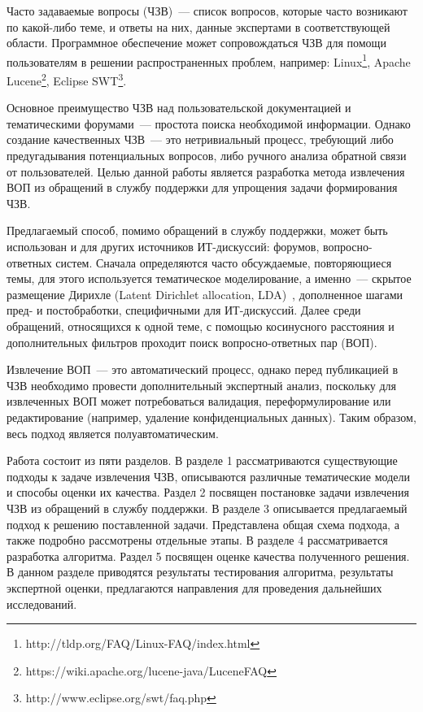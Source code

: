 \intro

Часто задаваемые вопросы (ЧЗВ)~--- список вопросов, которые часто возникают по какой-либо теме, и ответы на них, данные экспертами в соответствующей области. Программное обеспечение может сопровождаться ЧЗВ для помощи пользователям в решении распространенных проблем, например: Linux\footnote{http://tldp.org/FAQ/Linux-FAQ/index.html}, Apache Lucene\footnote{https://wiki.apache.org/lucene-java/LuceneFAQ}, Eclipse SWT\footnote{http://www.eclipse.org/swt/faq.php}.

Основное преимущество ЧЗВ над пользовательской документацией и тематическими форумами~--- простота поиска необходимой информации. Однако создание качественных ЧЗВ~--- это нетривиальный процесс, требующий либо предугадывания потенциальных вопросов, либо ручного анализа обратной связи от пользователей. Целью данной работы является разработка метода извлечения ВОП из обращений в службу поддержки для упрощения задачи формирования ЧЗВ.

Предлагаемый способ, помимо обращений в службу поддержки, может быть использован и для других источников ИТ-дискуссий: форумов, вопросно-ответных систем. Сначала определяются часто обсуждаемые, повторяющиеся темы, для этого используется тематическое моделирование, а именно~--- скрытое размещение Дирихле (Latent Dirichlet allocation, LDA)~\cite{LDA}, дополненное шагами пред- и постобработки, специфичными для ИТ-дискуссий. Далее среди обращений, относящихся к одной теме, с помощью косинусного расстояния и дополнительных фильтров проходит поиск вопросно-ответных пар (ВОП). 


Извлечение ВОП~--- это автоматический процесс, однако перед публикацией в ЧЗВ необходимо провести дополнительный экспертный анализ, поскольку для извлеченных ВОП может потребоваться валидация, переформулирование или редактирование (например, удаление конфиденциальных данных). Таким образом, весь подход является полуавтоматическим. 

Работа состоит из пяти разделов. В разделе 1 рассматриваются существующие подходы к задаче извлечения ЧЗВ, описываются различные тематические модели и способы оценки их качества. Раздел 2 посвящен постановке задачи извлечения ЧЗВ из обращений в службу поддержки. В разделе 3 описывается предлагаемый подход к решению поставленной задачи. Представлена общая схема подхода, а также подробно рассмотрены отдельные этапы. В разделе 4 рассматривается разработка алгоритма. Раздел 5 посвящен оценке качества полученного решения. В данном разделе приводятся результаты тестирования алгоритма, результаты экспертной оценки, предлагаются направления для проведения дальнейших исследований.